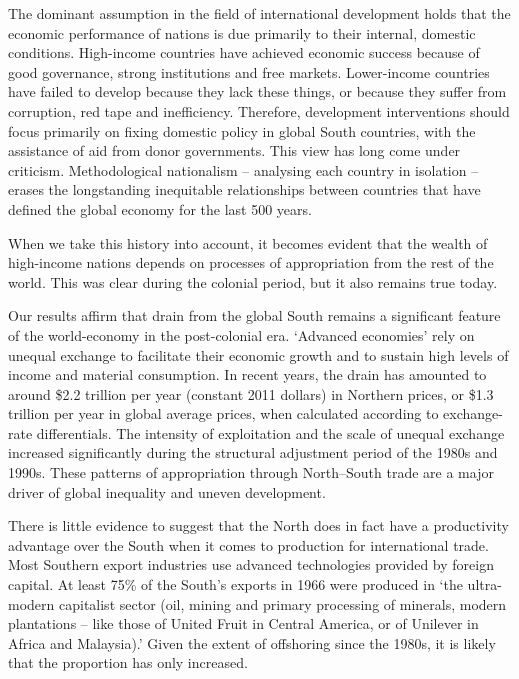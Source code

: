 \documentclass[
]{book}
\begin{document}
The dominant assumption in the field of international development
holds that the economic performance of nations is due primarily to
their internal, domestic conditions.
High-income countries have achieved economic success because of good governance,
strong institutions and free markets.
Lower-income countries have failed to develop because they lack these things, or
because they suffer from corruption, red tape and inefficiency.
Therefore, development interventions should focus primarily on fixing domestic
policy in global South countries, with the assistance of aid from donor governments.
This view has long come under criticism.
Methodological nationalism -- analysing each country in
isolation -- erases the longstanding inequitable relationships between
countries that have defined the global economy for the last 500 years.

When we take this history into account, it becomes evident
that the wealth of high-income nations depends on processes of appropriation
from the rest of the world.
This was clear during the colonial period, but it also remains true today.

Our results affirm that drain from the global South remains a significant
feature of the world-economy in the post-colonial era.
`Advanced economies' rely on unequal exchange to facilitate
their economic growth and to sustain high levels of income and material consumption.
In recent years, the drain has amounted to around \$2.2 trillion per year
(constant 2011 dollars) in Northern prices, or
\$1.3 trillion per year in global average prices,
when calculated according to exchange-rate differentials.
The intensity of exploitation and the scale of unequal exchange increased
significantly during the structural adjustment period of the 1980s and 1990s.
These patterns of appropriation through North--South trade are a major
driver of global inequality and uneven development.

There is little evidence to suggest that the North does in fact have
a productivity advantage over the South when it comes to production for
international trade.
Most Southern export industries use advanced technologies provided by foreign capital.
At least 75\% of the South's exports in 1966 were produced in `the
ultra-modern capitalist sector (oil, mining and primary processing of minerals,
modern plantations -- like those of United Fruit in Central America, or
of Unilever in Africa and Malaysia).'
Given the extent of offshoring since the 1980s,
it is likely that the proportion has only increased.
\end{document}

